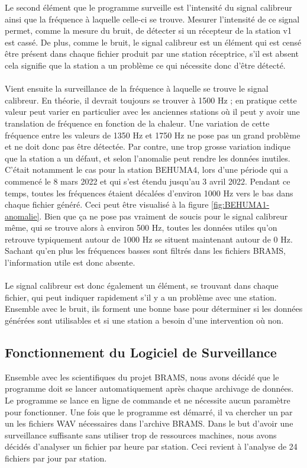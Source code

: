 \documentclass[11pt]{article}
\begin{document}
Le second élément que le programme surveille est l'intensité du signal calibreur ainsi que la fréquence à laquelle celle-ci se trouve.
Mesurer l'intensité de ce signal permet, comme la mesure du bruit, de détecter si un récepteur de la station v1 est cassé.
De plus, comme le bruit, le signal calibreur est un élément qui est censé être présent dans chaque fichier produit par une station réceptrice, s'il est absent cela signifie que la station a un problème ce qui nécessite donc d'être détecté.\\
\\
Vient ensuite la surveillance de la fréquence à laquelle se trouve le signal calibreur.
En théorie, il devrait toujours se trouver à 1500 Hz ; en pratique cette valeur peut varier en particulier avec les anciennes stations où il peut y avoir une translation de fréquence en fonction de la chaleur.
Une variation de cette fréquence entre les valeurs de 1350 Hz et 1750 Hz ne pose pas un grand problème et ne doit donc pas être détectée.
Par contre, une trop grosse variation indique que la station a un défaut, et selon l'anomalie peut rendre les données inutiles.
C'était notamment le cas pour la station BEHUMA4, lors d'une période qui a commencé le 8 mars 2022 et qui s'est étendu jusqu'au 3 avril 2022.
Pendant ce temps, toutes les fréquences étaient décalées d'environ 1000 Hz vers le bas dans chaque fichier généré.
Ceci peut être visualisé à la figure \ref{fig:BEHUMA1-anomalie}.
Bien que ça ne pose pas vraiment de soucis pour le signal calibreur même, qui se trouve alors à environ 500 Hz, toutes les données utiles qu'on retrouve typiquement autour de 1000 Hz se situent maintenant autour de 0 Hz.
Sachant qu'en plus les fréquences basses sont filtrés dans les fichiers BRAMS, l'information utile est donc absente.\\
\\
Le signal calibreur est donc également un élément, se trouvant dans chaque fichier, qui peut indiquer rapidement s'il y a un problème avec une station.
Ensemble avec le bruit, ils forment une bonne base pour déterminer si les données générées sont utilisables et si une station a besoin d'une intervention où non.

\subsection{Fonctionnement du Logiciel de Surveillance}

Ensemble avec les scientifiques du projet BRAMS, nous avons décidé que le programme doit se lancer automatiquement après chaque archivage de données.
Le programme se lance en ligne de commande et ne nécessite aucun paramètre pour fonctionner.
Une fois que le programme est démarré, il va chercher un par un les fichiers WAV nécessaires dans l'archive BRAMS.
Dans le but d'avoir une surveillance suffisante sans utiliser trop de ressources machines, nous avons décidés d'analyser un fichier par heure par station.
Ceci revient à l'analyse de 24 fichiers par jour par station.
\end{document}
